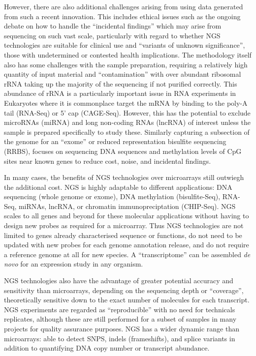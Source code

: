 However, there are also additional challenges arising from using data generated from such a recent innovation. This includes ethical issues such as the ongoing debate on how to handle the ``incidental findings'' which may arise from sequencing on such vast scale, particularly with regard to whether NGS technologies are suitable for clinical use and ``variants of unknown significance'', those with undetermined or contested health implications. The methodology itself also has some challenges with the sample preparation, requiring a relatively high quantity of input material and ``contamination'' with over abundant ribosomal rRNA taking up the majority of the sequencing if not purified correctly. This abundance of rRNA is a particularly important issue in RNA experiments in Eukaryotes where it is commonplace target the mRNA by binding to the poly-A tail (RNA-Seq) or 5' cap (CAGE-Seq). However, this has the potential to exclude microRNAs (miRNA) and long non-coding RNAs (lncRNA) of interest unless the sample is prepared specifically to study these. Similarly capturing a subsection of the genome for an ``exome'' or reduced representation bisulfite sequencing (RRBS), focuses on sequencing DNA sequences and methylation levels of CpG sites near known genes to reduce cost, noise, and incidental findings.

In many cases, the benefits of NGS technologies over microarrays still outwiegh the additional cost. NGS is highly adaptable to different applications: DNA sequencing (whole genome or exome), DNA methylation (bisulfite-Seq), RNA-Seq, miRNAs, lncRNA, or chromatin immunopreciptation (CHIP-Seq). NGS scales to all genes and beyond for these molecular applications without having to design new probes as required for a microarray. Thus NGS technologies are not limited to genes already characterised sequence or functions, do not need to be updated with new probes for each genome annotation release, and do not require a reference genome at all for new species. A ``transcriptome'' can be assembled \textit{de novo} for an expression study in any organism.

NGS technologies also have the advantage of greater potential accuracy and sensitivity than microarrays, depending on the sequencing depth or ``coverage'', theoretically sensitive down to the exact number of molecules for each transcript. NGS experiments are regarded as ``reproducible'' with no need for technicals replicates, although these are still performed for a subset of samples in many projects for quality assurance purposes. NGS has a wider dynamic range than microarrays: able to detect SNPS, indels (frameshifts), and splice variants in addition to quantifying DNA copy number or transcript abundance.

